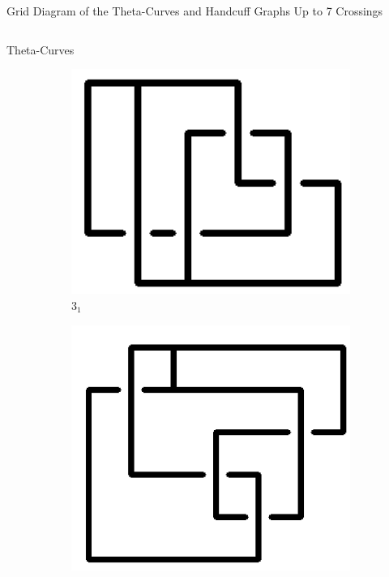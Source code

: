 \documentclass[final]{beamer}
\begin{document}
\begin{frame}[t]
 \begin{alertblock}{Grid Diagram of the Theta-Curves and Handcuff Graphs Up to 7 Crossings}
  \hspace{1cm}
  \begin{columns}[t]
  \begin{column}{0.5\textwidth}
  \begin{alertblock}{Theta-Curves}
  \begin{figure}
    \begin{subfigure}{0.075\textwidth}
    \includegraphics[width=\columnwidth]{../Midterm_Poster/grid_diagram/theta_3_1.png}
    \caption{$3_1$} 
    \end{subfigure}
    \begin{subfigure}{0.075\textwidth}
    \includegraphics[width=\columnwidth]{../Midterm_Poster/grid_diagram/theta_4_1.png}

\end{subfigure}
\end{figure}
\end{alertblock}
\end{column}
\end{columns}
\end{alertblock}
\end{frame}
\end{document}
